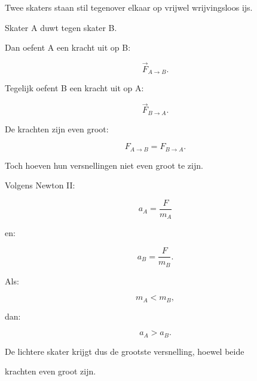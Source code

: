 \documentclass{ximera}
\begin{document}
\begin{voorbeeld}

Twee skaters staan stil tegenover elkaar op vrijwel wrijvingsloos ijs.

Skater A duwt tegen skater B.

Dan oefent A een kracht uit op B:

\[\vec F_{A\rightarrow B}.\]

Tegelijk oefent B een kracht uit op A:

\[\vec F_{B\rightarrow A}.\]

De krachten zijn even groot:

\[F_{A\rightarrow B} = F_{B\rightarrow A}.\]

Toch hoeven hun versnellingen niet even groot te zijn.

Volgens Newton II:

\[a_A = \frac{F}{m_A}\]

en:

\[a_B = \frac{F}{m_B}.\]

Als:

\[m_A<m_B,\]

dan:

\[a_A>a_B.\]

De lichtere skater krijgt dus de grootste versnelling, hoewel beide

krachten even groot zijn.

\end{voorbeeld}
\end{document}
